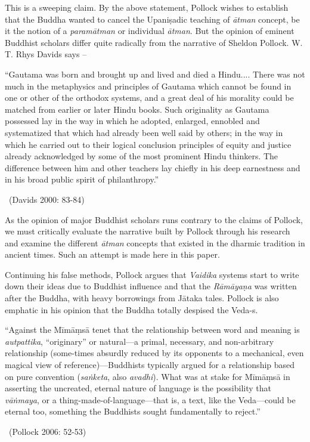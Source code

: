 This is a sweeping claim. By the above statement, Pollock wishes to establish that the Buddha wanted to cancel the Upaniṣadic teaching of \textit{ātman} concept, be it the notion of a \textit{paramātman} or individual \textit{ātman}. But the opinion of eminent Buddhist scholars differ quite radically from the narrative of Sheldon Pollock. W. T. Rhys Davids says –

\begin{myquote}
“Gautama was born and brought up and lived and died a Hindu.... There was not much in the metaphysics and principles of Gautama which cannot be found in one or other of the orthodox systems, and a great deal of his morality could be matched from earlier or later Hindu books. Such originality as Gautama possessed lay in the way in which he adopted, enlarged, ennobled and systematized that which had already been well said by others; in the way in which he carried out to their logical conclusion principles of equity and justice already acknowledged by some of the most prominent Hindu thinkers. The difference between him and other teachers lay chiefly in his deep earnestness and in his broad public spirit of philanthropy.” 

~\hfill (Davids 2000: 83-84)
\end{myquote}

As the opinion of major Buddhist scholars runs contrary to the claims of Pollock, we must critically evaluate the narrative built by Pollock through his research and examine the different \textit{ātman} concepts that existed in the dharmic tradition in ancient times. Such an attempt is made here in this paper.

Continuing his false methods, Pollock argues that \textit{Vaidika} systems start to write down their ideas due to Buddhist influence and that the \textit{Rāmāyaṇa} was written after the Buddha, with heavy borrowings from Jātaka tales. Pollock is also emphatic in his opinion that the Buddha totally despised the Veda-s.

\begin{myquote}
“Against the Mīmāṃsā tenet that the relationship between word and meaning is \textit{autpattika}, “originary” or natural—a primal, necessary, and non-arbitrary relationship (some-times absurdly reduced by its opponents to a mechanical, even magical view of reference)—Buddhists typically argued for a relationship based on pure convention (\textit{saṅketa}, also \textit{avadhi}). What was at stake for Mīmāṃsā in asserting the uncreated, eternal nature of language is the possibility that \textit{vāṅmaya}, or a thing-made-of-language—that is, a text, like the Veda—could be eternal too, something the Buddhists sought fundamentally to reject.” 

~\hfill (Pollock 2006: 52-53)
\end{myquote}

